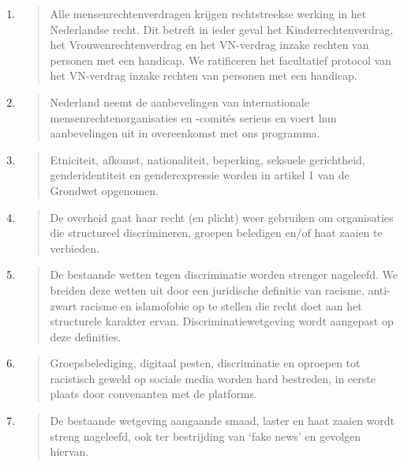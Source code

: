 \begin{enumerate}
\def\labelenumi{\arabic{enumi}.}
\item
  \begin{quote}
  Alle mensenrechtenverdragen krijgen rechtstreekse werking in het
  Nederlandse recht. Dit betreft in ieder geval het
  Kinderrechtenverdrag, het Vrouwenrechtenverdrag en het VN-verdrag
  inzake rechten van personen met een handicap. We ratificeren het
  facultatief protocol van het VN-verdrag inzake rechten van personen
  met een handicap.
  \end{quote}
\item
  \begin{quote}
  Nederland neemt de aanbevelingen van internationale
  mensenrechtenorganisaties en -comités serieus en voert hun
  aanbevelingen uit in overeenkomst met ons programma.
  \end{quote}
\item
  \begin{quote}
  Etniciteit, afkomst, nationaliteit, beperking, seksuele gerichtheid,
  genderidentiteit en genderexpressie worden in artikel 1 van de
  Grondwet opgenomen.
  \end{quote}
\item
  \begin{quote}
  De overheid gaat haar recht (en plicht) weer gebruiken om organisaties
  die structureel discrimineren, groepen beledigen en/of haat zaaien te
  verbieden.
  \end{quote}
\item
  \begin{quote}
  De bestaande wetten tegen discriminatie worden strenger nageleefd. We
  breiden deze wetten uit door een juridische definitie van racisme,
  anti-zwart racisme en islamofobie op te stellen die recht doet aan het
  structurele karakter ervan. Discriminatiewetgeving wordt aangepast op
  deze definities.
  \end{quote}
\item
  \begin{quote}
  Groepsbelediging, digitaal pesten, discriminatie en oproepen tot
  racistisch geweld op sociale media worden hard bestreden, in eerste
  plaats door convenanten met de platforms.
  \end{quote}
\item
  \begin{quote}
  De bestaande wetgeving aangaande smaad, laster en haat zaaien wordt
  streng nageleefd, ook ter bestrijding van `fake news' en gevolgen
  hiervan.
  \end{quote}

\end{enumerate}

